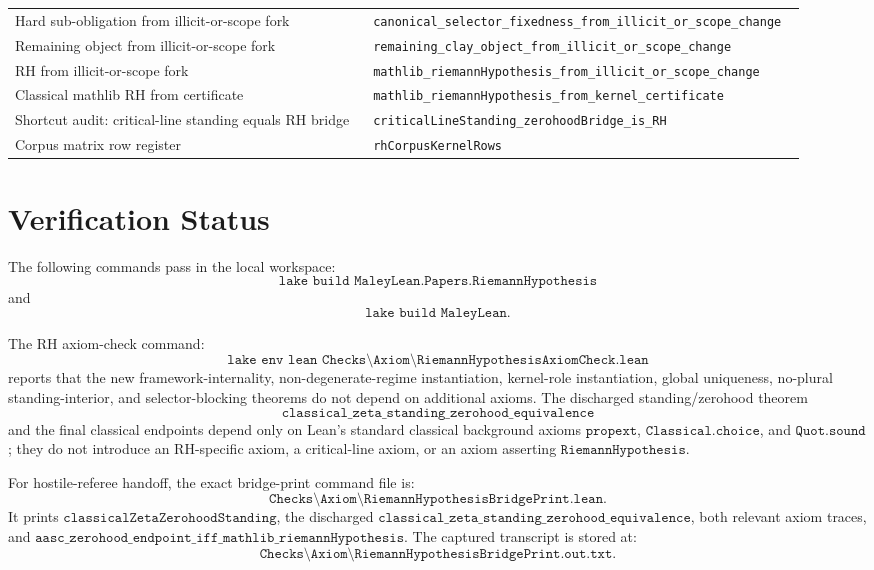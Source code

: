 \documentclass[11pt]{article}
\begin{document}
\begin{center}
\begin{longtable}{p{0.44\linewidth}p{0.48\linewidth}}
Hard sub-obligation from illicit-or-scope fork
  & \texttt{canonical\_selector\_fixedness\_from\_illicit\_or\_scope\_change} \\
Remaining object from illicit-or-scope fork
  & \texttt{remaining\_clay\_object\_from\_illicit\_or\_scope\_change} \\
RH from illicit-or-scope fork
  & \texttt{mathlib\_riemannHypothesis\_from\_illicit\_or\_scope\_change} \\
Classical mathlib RH from certificate
  & \texttt{mathlib\_riemannHypothesis\_from\_kernel\_certificate} \\
Shortcut audit: critical-line standing equals RH bridge
  & \texttt{criticalLineStanding\_zerohoodBridge\_is\_RH} \\
Corpus matrix row register
  & \texttt{rhCorpusKernelRows} \\
\bottomrule
\end{longtable}
\end{center}

\section{Verification Status}

The following commands pass in the local workspace:
\[
\texttt{lake build MaleyLean.Papers.RiemannHypothesis}
\]
and
\[
\texttt{lake build MaleyLean}.
\]

The RH axiom-check command:
\[
\texttt{lake env lean Checks\textbackslash Axiom\textbackslash RiemannHypothesisAxiomCheck.lean}
\]
reports that the new framework-internality, non-degenerate-regime
instantiation, kernel-role instantiation, global uniqueness, no-plural
standing-interior, and selector-blocking theorems do not depend on additional
axioms.  The discharged standing/zerohood theorem
\[
\texttt{classical\_zeta\_standing\_zerohood\_equivalence}
\]
and the final classical endpoints depend only on Lean's standard classical
background axioms \(\texttt{propext}\), \(\texttt{Classical.choice}\), and
\(\texttt{Quot.sound}\); they do not introduce an RH-specific axiom, a
critical-line axiom, or an axiom asserting \(\texttt{RiemannHypothesis}\).

For hostile-referee handoff, the exact bridge-print command file is:
\[
\texttt{Checks\textbackslash Axiom\textbackslash RiemannHypothesisBridgePrint.lean}.
\]
It prints \(\texttt{classicalZetaZerohoodStanding}\), the discharged
\(\texttt{classical\_zeta\_standing\_zerohood\_equivalence}\), both relevant
axiom traces, and
\(\texttt{aasc\_zerohood\_endpoint\_iff\_mathlib\_riemannHypothesis}\).  The
captured transcript is stored at:
\[
\texttt{Checks\textbackslash Axiom\textbackslash RiemannHypothesisBridgePrint.out.txt}.
\]
\end{document}
